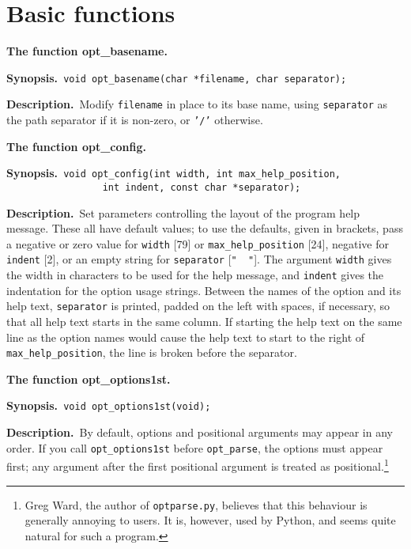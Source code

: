 \documentclass{article}
\newenvironment{chunk}[1]
{\par\smallskip\noindent\textbf{#1.}\par\nopagebreak}
{\par\smallskip}
\renewcommand{\tt}{\texttt}
\newcommand{\synopsis}{\par\noindent\textbf{Synopsis.}}
\newcommand{\synocont}{\\\phantom{\textbf{Synopsis.}}}
\newcommand{\descr}{\par\noindent\textbf{Description.}\ }
\begin{document}
\section{Basic functions}
\begin{chunk}{The function opt\_basename}
  \synopsis\verb+ void opt_basename(char *filename, char separator);+
  \descr Modify \tt{filename} in place to its base name, using
  \tt{separator} as the path separator if it is non-zero, or
  \tt{'/'} otherwise.
\end{chunk}
\begin{chunk}{The function opt\_config}
  \synopsis\verb+ void opt_config(int width, int max_help_position,+
  \synocont\verb+                 int indent, const char *separator);+
  \descr Set parameters controlling the layout of the program help
  message. These all have default values; to use the defaults, given
  in brackets, pass a negative or zero value for \tt{width} [79] or
  \tt{max\_help\_position} [24], negative for \tt{indent} [2], or an
  empty string for \tt{separator} [\verb*+"  "+]. The argument
  \tt{width} gives the width in characters to be used for the help
  message, and \tt{indent} gives the indentation for the option usage
  strings. Between the names of the option and its help text,
  \tt{separator} is printed, padded on the left with spaces, if
  necessary, so that all help text starts in the same column. If
  starting the help text on the same line as the option names would
  cause the help text to start to the right of
  \tt{max\_help\_position}, the line is broken before the separator. 
\end{chunk}
\begin{chunk}{The function opt\_options1st}
  \synopsis\verb+ void opt_options1st(void);+
  \descr By default, options and positional arguments may appear in
  any order. If you call \tt{opt\_options1st} before \tt{opt\_parse},
  the options must appear first; any argument after the first
  positional argument is treated as positional.\footnote{Greg Ward,
    the author of \tt{optparse.py}, believes that this behaviour is
    generally annoying to users. It is, however, used by Python, and
    seems quite natural for such a program.}
\end{chunk}
\end{document}
